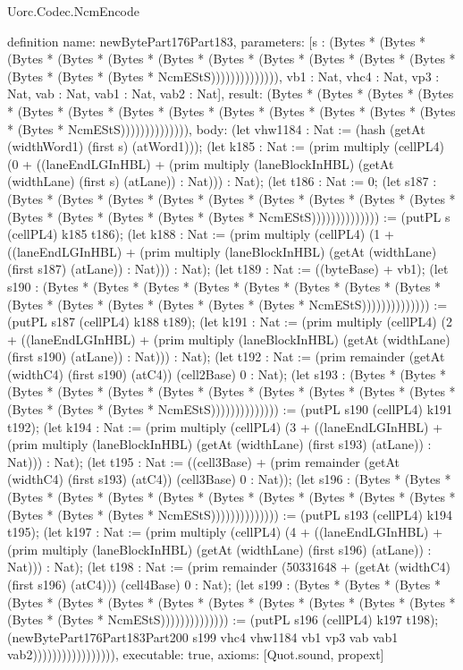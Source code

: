 \begin{lexlean}{Uorc.Codec.NcmEncode}
\begin{semanticmodule}
definition{
  name: newBytePart176Part183,
  parameters: [s : (Bytes * (Bytes * (Bytes * (Bytes * (Bytes * (Bytes * (Bytes * (Bytes * (Bytes * (Bytes * (Bytes * (Bytes * (Bytes * (Bytes * NcmEStS)))))))))))))), vb1 : Nat, vhc4 : Nat, vp3 : Nat, vab : Nat, vab1 : Nat, vab2 : Nat],
  result: (Bytes * (Bytes * (Bytes * (Bytes * (Bytes * (Bytes * (Bytes * (Bytes * (Bytes * (Bytes * (Bytes * (Bytes * (Bytes * (Bytes * NcmEStS)))))))))))))),
  body: (let vhw1184 : Nat := (hash (getAt (widthWord1) (first s) (atWord1))); (let k185 : Nat := (prim multiply (cellPL4) (0 + ((laneEndLGInHBL) + (prim multiply (laneBlockInHBL) (getAt (widthLane) (first s) (atLane)) : Nat))) : Nat); (let t186 : Nat := 0; (let s187 : (Bytes * (Bytes * (Bytes * (Bytes * (Bytes * (Bytes * (Bytes * (Bytes * (Bytes * (Bytes * (Bytes * (Bytes * (Bytes * (Bytes * NcmEStS)))))))))))))) := (putPL s (cellPL4) k185 t186); (let k188 : Nat := (prim multiply (cellPL4) (1 + ((laneEndLGInHBL) + (prim multiply (laneBlockInHBL) (getAt (widthLane) (first s187) (atLane)) : Nat))) : Nat); (let t189 : Nat := ((byteBase) + vb1); (let s190 : (Bytes * (Bytes * (Bytes * (Bytes * (Bytes * (Bytes * (Bytes * (Bytes * (Bytes * (Bytes * (Bytes * (Bytes * (Bytes * (Bytes * NcmEStS)))))))))))))) := (putPL s187 (cellPL4) k188 t189); (let k191 : Nat := (prim multiply (cellPL4) (2 + ((laneEndLGInHBL) + (prim multiply (laneBlockInHBL) (getAt (widthLane) (first s190) (atLane)) : Nat))) : Nat); (let t192 : Nat := (prim remainder (getAt (widthC4) (first s190) (atC4)) (cell2Base) 0 : Nat); (let s193 : (Bytes * (Bytes * (Bytes * (Bytes * (Bytes * (Bytes * (Bytes * (Bytes * (Bytes * (Bytes * (Bytes * (Bytes * (Bytes * (Bytes * NcmEStS)))))))))))))) := (putPL s190 (cellPL4) k191 t192); (let k194 : Nat := (prim multiply (cellPL4) (3 + ((laneEndLGInHBL) + (prim multiply (laneBlockInHBL) (getAt (widthLane) (first s193) (atLane)) : Nat))) : Nat); (let t195 : Nat := ((cell3Base) + (prim remainder (getAt (widthC4) (first s193) (atC4)) (cell3Base) 0 : Nat)); (let s196 : (Bytes * (Bytes * (Bytes * (Bytes * (Bytes * (Bytes * (Bytes * (Bytes * (Bytes * (Bytes * (Bytes * (Bytes * (Bytes * (Bytes * NcmEStS)))))))))))))) := (putPL s193 (cellPL4) k194 t195); (let k197 : Nat := (prim multiply (cellPL4) (4 + ((laneEndLGInHBL) + (prim multiply (laneBlockInHBL) (getAt (widthLane) (first s196) (atLane)) : Nat))) : Nat); (let t198 : Nat := (prim remainder (50331648 + (getAt (widthC4) (first s196) (atC4))) (cell4Base) 0 : Nat); (let s199 : (Bytes * (Bytes * (Bytes * (Bytes * (Bytes * (Bytes * (Bytes * (Bytes * (Bytes * (Bytes * (Bytes * (Bytes * (Bytes * (Bytes * NcmEStS)))))))))))))) := (putPL s196 (cellPL4) k197 t198); (newBytePart176Part183Part200 s199 vhc4 vhw1184 vb1 vp3 vab vab1 vab2))))))))))))))))),
  executable: true,
  axioms: [Quot.sound, propext]
}


\end{semanticmodule}
\end{lexlean}
